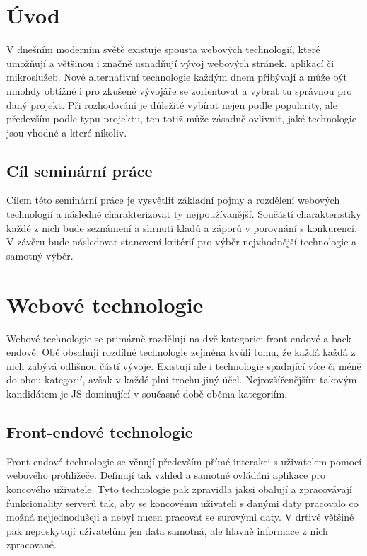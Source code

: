 \section{Úvod}

V dnešním moderním světě existuje spousta webových technologií, které umožňují a většinou i značně usnadňují vývoj
webových stránek, aplikací či mikroslužeb.
Nové alternativní technologie každým dnem přibývají a může být mnohdy obtížné i pro zkušené
vývojáře se zorientovat a vybrat tu správnou pro daný projekt.
Při rozhodování je důležité vybírat nejen podle popularity, ale především podle typu projektu, ten totiž může zásadně
ovlivnit, jaké technologie jsou vhodné a které nikoliv.


	\subsection{Cíl seminární práce}

	Cílem této seminární práce je vysvětlit základní pojmy a rozdělení webových technologií a následně
	charakterizovat ty nejpoužívanější.
	Součástí charakteristiky každé z nich bude seznámení a shrnutí kladů a záporů v porovnání s konkurencí.
	V závěru bude následovat stanovení kritérií pro výběr nejvhodnější technologie a samotný výběr.


\section{Webové technologie}

Webové technologie se primárně rozdělují na dvě kategorie: front-endové a back-endové.
Obě obsahují rozdílné technologie zejména kvůli tomu, že každá každá z nich zabývá odlišnou částí
vývoje.
Existují ale i technologie spadající více či méně do obou kategorií, avšak v každé plní trochu jiný účel.
Nejrozšířenějším takovým kandidátem je \noindent\ac{JS} dominující v současné době oběma kategoriím.

	\subsection{Front-endové technologie}

	Front-endové technologie se věnují především přímé interakci s uživatelem pomocí webového prohlížeče.
	Definují tak vzhled a samotné ovládání aplikace pro koncového uživatele.
	Tyto technologie pak zpravidla jaksi obalují a zpracovávají funkcionality serverů tak, aby se koncovému uživateli s danými
	daty pracovalo co možná nejjednodušeji a nebyl nucen pracovat se surovými daty.
	V drtivé většině pak neposkytují uživatelům jen data samotná, ale hlavně informace z nich zpracované.

